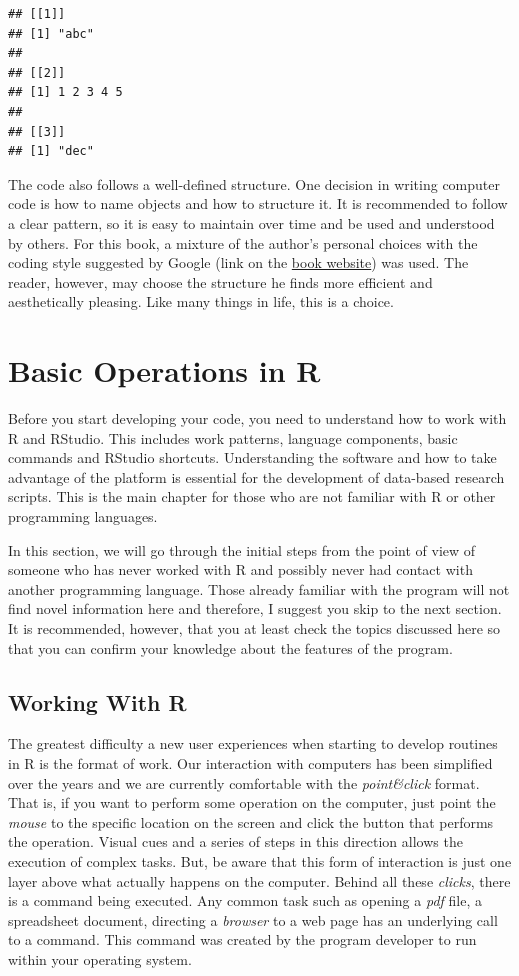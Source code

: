 \documentclass[11pt,]{book}
\begin{document}
\begin{verbatim}
## [[1]]
## [1] "abc"
## 
## [[2]]
## [1] 1 2 3 4 5
## 
## [[3]]
## [1] "dec"
\end{verbatim}

The code also follows a well-defined structure. One decision in writing
computer code is how to name objects and how to structure it. It is
recommended to follow a clear pattern, so it is easy to maintain over
time and be used and understood by others. For this book, a mixture of
the author's personal choices with the coding style suggested by Google
(link on the \href{https://sites.google.com/view/pmfdr/home}{book
website}) was used. The reader, however, may choose the structure he
finds more efficient and aesthetically pleasing. Like many things in
life, this is a choice.

\chapter{Basic Operations in R}\label{basic-operations-in-r}

Before you start developing your code, you need to understand how to
work with R and RStudio. This includes work patterns, language
components, basic commands and RStudio shortcuts. Understanding the
software and how to take advantage of the platform is essential for the
development of data-based research scripts. This is the main chapter for
those who are not familiar with R or other programming languages.

In this section, we will go through the initial steps from the point of
view of someone who has never worked with R and possibly never had
contact with another programming language. Those already familiar with
the program will not find novel information here and therefore, I
suggest you skip to the next section. It is recommended, however, that
you at least check the topics discussed here so that you can confirm
your knowledge about the features of the program.

\section{Working With R}\label{working-with-r}

The greatest difficulty a new user experiences when starting to develop
routines in R is the format of work. Our interaction with computers has
been simplified over the years and we are currently comfortable with the
\emph{point\&click} format. That is, if you want to perform some
operation on the computer, just point the \emph{mouse} to the specific
location on the screen and click the button that performs the operation.
Visual cues and a series of steps in this direction allows the execution
of complex tasks. But, be aware that this form of interaction is just
one layer above what actually happens on the computer. Behind all these
\emph{clicks}, there is a command being executed. Any common task such
as opening a \emph{pdf} file, a spreadsheet document, directing a
\emph{browser} to a web page has an underlying call to a command. This
command was created by the program developer to run within your
operating system.
\end{document}
